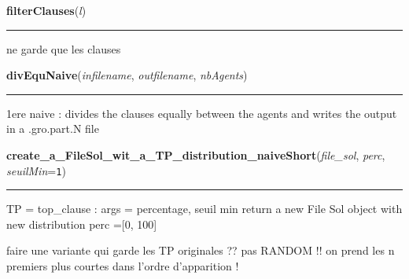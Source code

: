     \vspace{0.5ex}

\hspace{.8\funcindent}\begin{boxedminipage}{\funcwidth}

    \raggedright \textbf{filterClauses}(\textit{l})

    \vspace{-1.5ex}

    \rule{\textwidth}{0.5\fboxrule}
\setlength{\parskip}{2ex}
    ne garde que les clauses

\setlength{\parskip}{1ex}
    \end{boxedminipage}

    \label{etude:problems:partitioning:divEquNaive}

    \vspace{0.5ex}

\hspace{.8\funcindent}\begin{boxedminipage}{\funcwidth}

    \raggedright \textbf{divEquNaive}(\textit{infilename}, \textit{outfilename}, \textit{nbAgents})

    \vspace{-1.5ex}

    \rule{\textwidth}{0.5\fboxrule}
\setlength{\parskip}{2ex}
    1ere naive : divides the clauses equally between the agents and writes 
    the output in a .gro.part.N file

\setlength{\parskip}{1ex}
    \end{boxedminipage}

    \label{etude:problems:partitioning:create_a_FileSol_wit_a_TP_distribution_naiveShort}

    \vspace{0.5ex}

\hspace{.8\funcindent}\begin{boxedminipage}{\funcwidth}

    \raggedright \textbf{create\_a\_FileSol\_wit\_a\_TP\_distribution\_naiveShort}(\textit{file\_sol}, \textit{perc}, \textit{seuilMin}={\tt 1})

    \vspace{-1.5ex}

    \rule{\textwidth}{0.5\fboxrule}
\setlength{\parskip}{2ex}
    TP = top\_clause : args = percentage, seuil min return a new File Sol 
    object with new distribution perc =[0, 100]

    faire une variante qui garde les TP originales ?? pas RANDOM !! on 
    prend les n premiers plus courtes dans l'ordre d'apparition !

\setlength{\parskip}{1ex}
    \end{boxedminipage}

